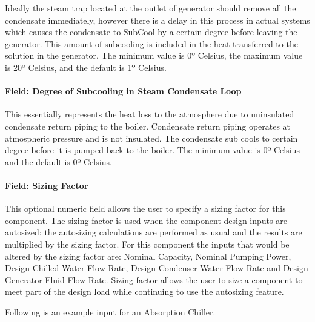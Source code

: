 Ideally the steam trap located at the outlet of generator should remove all the condensate immediately, however there is a delay in this process in actual systems which causes the condensate to SubCool by a certain degree before leaving the generator. This amount of subcooling is included in the heat transferred to the solution in the generator. The minimum value is 0º Celsius, the maximum value is 20º Celsius, and the default is 1º Celsius.

\paragraph{Field: Degree of Subcooling in Steam Condensate Loop}\label{field-degree-of-subcooling-in-steam-condensate-loop}

This essentially represents the heat loss to the atmosphere due to uninsulated condensate return piping to the boiler. Condensate return piping operates at atmospheric pressure and is not insulated. The condensate sub cools to certain degree before it is pumped back to the boiler. The minimum value is 0º Celsius and the default is 0º Celsius.

\paragraph{Field: Sizing Factor}\label{field-sizing-factor-1-001}

This optional numeric field allows the user to specify a sizing factor for this component. The sizing factor is used when the component design inputs are autosized: the autosizing calculations are performed as usual and the results are multiplied by the sizing factor. For this component the inputs that would be altered by the sizing factor are: Nominal Capacity, Nominal Pumping Power, Design Chilled Water Flow Rate, Design Condenser Water Flow Rate and Design Generator Fluid Flow Rate. Sizing factor allows the user to size a component to meet part of the design load while continuing to use the autosizing feature.

Following is an example input for an Absorption Chiller.

